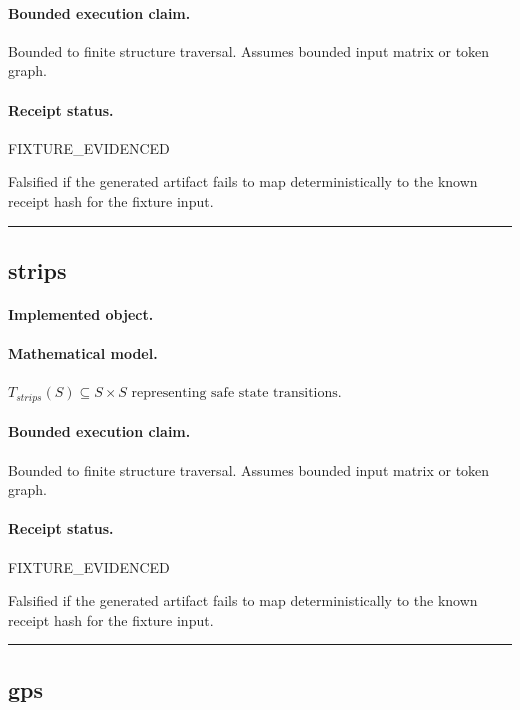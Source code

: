 \paragraph{Bounded execution claim.} Bounded to finite structure traversal. Assumes bounded input matrix or token graph.
\paragraph{Receipt status.} FIXTURE\_EVIDENCED
\begin{falsifier}
Falsified if the generated artifact fails to map deterministically to the known receipt hash for the fixture input.
\end{falsifier}

\vspace{1em}\hrule\vspace{1em}
\subsection{strips}
\paragraph{Implemented object.} 
\paragraph{Mathematical model.} $T_{strips}(S) \subseteq S \times S \text{ representing safe state transitions}.$
\paragraph{Bounded execution claim.} Bounded to finite structure traversal. Assumes bounded input matrix or token graph.
\paragraph{Receipt status.} FIXTURE\_EVIDENCED
\begin{falsifier}
Falsified if the generated artifact fails to map deterministically to the known receipt hash for the fixture input.
\end{falsifier}

\vspace{1em}\hrule\vspace{1em}
\subsection{gps}
